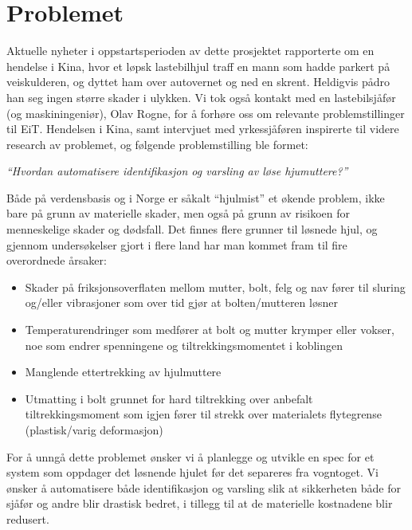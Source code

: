 \section{Problemet}

Aktuelle nyheter i oppstartsperioden av dette prosjektet rapporterte om en 
hendelse i Kina, hvor et løpsk lastebilhjul traff en mann som hadde parkert på 
veiskulderen, og dyttet ham over autovernet og ned en skrent. Heldigvis pådro 
han seg ingen større skader i ulykken. Vi tok også kontakt med en lastebilsjåfør
 (og maskiningeniør), Olav Rogne, for å forhøre oss om relevante problemstillinger 
til EiT. Hendelsen i Kina, samt intervjuet med yrkessjåføren inspirerte til videre
research av problemet, og følgende problemstilling ble formet:

\begin{center}
\emph{``Hvordan automatisere identifikasjon og varsling av løse hjumuttere?''}
\end{center}

Både på verdensbasis og i Norge er såkalt ``hjulmist'' et økende problem, ikke bare 
på grunn av materielle skader, men også på grunn av risikoen for menneskelige 
skader og dødsfall. Det finnes flere grunner til løsnede hjul, og gjennom undersøkelser 
gjort i flere land har man kommet fram til fire overordnede årsaker:

\begin{itemize}
\item{ Skader på friksjonsoverflaten mellom mutter, bolt, felg og nav fører til sluring og/eller
vibrasjoner som over tid gjør at bolten/mutteren løsner}
\item { Temperaturendringer som medfører at bolt og mutter krymper eller vokser, noe som 
endrer spenningene og tiltrekkingsmomentet i koblingen}
\item{ Manglende ettertrekking av hjulmuttere}
\item{ Utmatting i bolt grunnet for hard tiltrekking over anbefalt tiltrekkingsmoment som igjen 
fører til strekk over materialets flytegrense (plastisk/varig deformasjon)}
\end{itemize}

For å unngå dette problemet ønsker vi å planlegge og utvikle en spec for et system som oppdager 
det løsnende hjulet før det separeres fra vogntoget. Vi ønsker å automatisere både identifikasjon
og varsling slik at sikkerheten både for sjåfør og andre blir drastisk bedret, i tillegg til at de materielle
kostnadene blir redusert.

